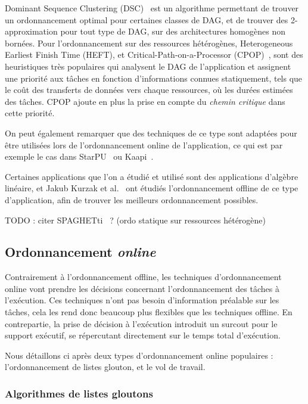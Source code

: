 Dominant Sequence Clustering (DSC)~\cite{Yang1994} est un algorithme permettant de trouver un ordonnancement optimal pour certaines classes de DAG, et de trouver des 2-approximation pour tout type de DAG, sur des architectures homogènes non bornées.
Pour l'ordonnancement sur des ressources hétérogènes, Heterogeneous Earliest Finish Time (HEFT), et Critical-Path-on-a-Processor (CPOP)~\cite{HEFT}, sont des heuristiques très populaires qui analysent le DAG de l'application et assignent une priorité aux tâches en fonction d'informations connues statiquement, tels que le coût des transferts de données vers chaque ressources, où les durées estimées des tâches.
CPOP ajoute en plus la prise en compte du \emph{chemin critique} dans cette priorité.

On peut également remarquer que des techniques de ce type sont adaptées pour être utilisées lors de l'ordonnancement online de l'application, ce qui est par exemple le cas dans StarPU~\cite{StarPU} ou Kaapi~\cite{Gautier2007}.

Certaines applications que l'on a étudié et utilisé sont des applications d'algèbre linéaire, et Jakub Kurzak et al.~\cite{Kurzak2010} ont étudiés l'ordonnancement offline de ce type d'application, afin de trouver les meilleurs ordonnancement possibles.

TODO : citer SPAGHETti~\cite{Barthou2014} ? (ordo statique sur ressources hétérogène)



\subsection{Ordonnancement \emph{online}}

Contrairement à l'ordonnancement offline, les techniques d'ordonnancement online vont prendre les décisions concernant l'ordonnancement des tâches à l'exécution.
Ces techniques n'ont pas besoin d'information préalable sur les tâches, cela les rend donc beaucoup plus flexibles que les techniques offline.
En contrepartie, la prise de décision à l'exécution introduit un surcout pour le support exécutif, se répercutant directement sur le temps total d'exécution.


Nous détaillons ci après deux types d'ordonnancement online populaires : l'ordonnancement de listes glouton, et le vol de travail.

\subsubsection{Algorithmes de listes gloutons}

